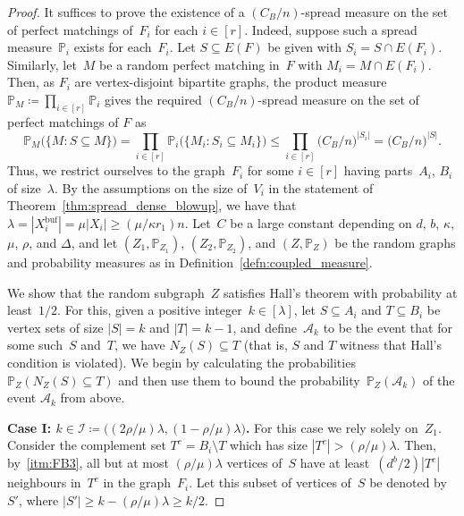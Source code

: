 \documentclass[10pt,a4paper]{amsart}
\newcommand{\buf}{\mathrm{buf}}
\begin{document}
\begin{proof}
    It suffices to prove the existence of a $(C_B/ n)$-spread measure on the set of perfect matchings of~$F_i$ for each $i \in [r]$. Indeed, suppose such a spread measure~$\mathds{P}_i$ exists for each~$F_i$. Let $S \subseteq E(F)$ be given with $S_i = S \cap E(F_i)$. Similarly, let~$M$ be a random perfect matching in~$F$ with $M_i = M \cap E(F_i)$. Then, as $F_i$ are vertex-disjoint bipartite graphs, the product measure $\mathds{P}_M \coloneqq \prod_{i \in [r]} \mathds{P}_i$ gives the required $(C_B/n)$-spread measure on the set of perfect matchings of $F$ as 
    \[\mathds{P}_M\bigl(\{M : S \subseteq M\}\bigr) = \prod_{i \in [r]} \mathds{P}_i\bigl(\{M_i : S_i \subseteq M_i\}\bigr) \leq \prod_{i \in [r]} \bigl( C_B/n \bigr)^{|S_i|} = \bigl( C_B/n\bigr)^{|S|}.\]
    \indent Thus, we restrict ourselves to the graph~$F_i$ for some $i \in [r]$
    having parts~$A_i$, $B_i$ of size~$\lambda$. By the assumptions on the size of~$V_i$ in the statement of Theorem~\ref{thm:spread_dense_blowup}, we have that $\lambda = |X^{\buf}_i| = \mu|X_i| \geq (\mu/\kappa r_1)n$. Let~$C$ be a large constant depending on $d$, $b$, $\kappa$, $\mu$, $\rho$, and $\Delta$, and let $(Z_1, \mathds{P}_{Z_1})$, $(Z_2, \mathds{P}_{Z_2})$, and $(Z, \mathds{P}_Z)$ be the random graphs and probability measures as in Definition~\ref{defn:coupled_measure}. 
    
    We show that the random subgraph~$Z$ satisfies Hall's theorem with probability at least~$1/2$. For this, given a positive integer~$k \in [\lambda]$, let $S \subseteq A_i$ and $T \subseteq B_i$ be vertex sets of size $|S| = k$ and $|T| = k-1$, and define~$\mathcal{A}_k$ to be the event that for some such~$S$ and~$T$, we have $N_Z(S) \subseteq T$ (that is, $S$ and $T$ witness that Hall's condition is violated). We begin by calculating the probabilities $\mathds{P}_Z(N_Z(S) \subseteq T)$ and then use them to bound the probability~$\mathds{P}_Z(\mathcal{A}_k)$ of the event $\mathcal{A}_k$ from above. 

    \noindent \textbf{Case I: $k \in \mathcal{I} \coloneqq \bigl( (2\rho/\mu)\lambda, ( 1 - \rho/\mu)\lambda\bigr)$.} For this case we rely solely on~$Z_1$. Consider the complement set $T^c = B_i\setminus T$ which has size $|T^c| > (\rho/\mu)\lambda$. Then, by~\ref{itm:FB3}, all but at most $(\rho/\mu)\lambda$ vertices of~$S$ have at least~$(d^b/2)|T^c|$ neighbours in~$T^c$ in the graph~$F_i$. Let this subset of vertices of~$S$ be denoted by~$S'$, where $|S'| \geq k - (\rho/\mu)\lambda \geq k/2$. 
    

\end{proof}
\end{document}
